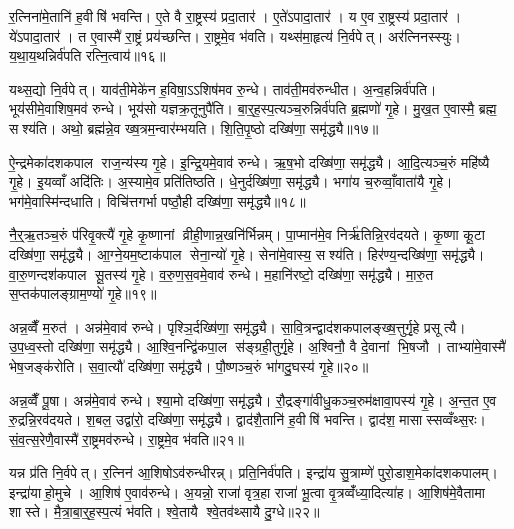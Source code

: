 र॒त्निना॑मे॒तानि॑ ह॒वीषि॑ भवन्ति। ए॒ते वै रा॒ष्ट्रस्य॑ प्रदा॒तार॑। ए॒ते॑ऽपादा॒तार॑। य ए॒व रा॒ष्ट्रस्य॑ प्रदा॒तार॑। ये॑ऽपादा॒तार॑। त ए॒वास्मै॑ रा॒ष्ट्रं प्रय॑च्छन्ति। रा॒ष्ट्रमे॒व भ॑वति। यथ्स॑मा॒हृत्य॑ नि॒र्वपेत्। अर॑त्निनस्स्युः। य॒था॒य॒थन्निर्व॑पति रत्नि॒त्वाय॑॥१६॥

यथ्स॒द्यो नि॒र्वपेत्। याव॑ती॒मेके॑न ह॒विषा॒ऽऽशिष॑मव रु॒न्धे। ताव॑ती॒मव॑रुन्धीत। अ॒न्व॒हन्निर्व॑पति। भूय॑सीमे॒वाशिष॒मव॑ रुन्धे। भूय॑सो यज्ञक्र॒तूनुपै॑ति। बा॒र्॒ह॒स्प॒त्यञ्च॒रुन्निर्व॑पति ब्र॒ह्मणो॑ गृ॒हे। मु॒ख॒त ए॒वास्मै॒ ब्रह्म॒ सश्य॑ति। अथो॒ ब्रह्म॑न्ने॒व ख्ष॒त्रम॒न्वार॑म्भयति। शि॒ति॒पृ॒ष्ठो दख्षि॑णा॒ समृ॑द्ध्यै॥१७॥

ऐ॒न्द्रमेका॑दशकपाल राज॒न्य॑स्य गृ॒हे। इ॒न्द्रि॒यमे॒वाव॑ रुन्धे। ऋ॒ष॒भो दख्षि॑णा॒ समृ॑द्ध्यै। आ॒दि॒त्यञ्च॒रुं महि॑ष्यै गृ॒हे। इ॒यव्वाँ अदि॑तिः। अ॒स्यामे॒व प्रति॑तिष्ठति। धे॒नुर्दख्षि॑णा॒ समृ॑द्ध्यै। भगा॑य च॒रुव्वाँ॒वाता॑यै गृ॒हे। भग॑मे॒वास्मि॑न्दधाति। विचि॑त्तगर्भा पष्ठौ॒ही दख्षि॑णा॒ समृ॑द्ध्यै॥१८॥

नै॒र्॒ऋ॒तञ्च॒रुं प॑रिवृ॒क्त्यै॑ गृ॒हे कृ॒ष्णानां व्रीही॒णान्न॒खनि॑र्भिन्नम्। पा॒प्मान॑मे॒व निर्\mbox{}ऋ॑तिन्नि॒रव॑दयते। कृ॒ष्णा कू॒टा दख्षि॑णा॒ समृ॑द्ध्यै। आ॒ग्ने॒यम॒ष्टाक॑पाल सेना॒न्यो॑ गृ॒हे। सेना॑मे॒वास्य॒ सश्य॑ति। हिर॑ण्य॒न्दख्षि॑णा॒ समृ॑द्ध्यै। वा॒रु॒णन्दश॑कपाल सू॒तस्य॑ गृ॒हे। व॒रु॒ण॒स॒वमे॒वाव॑ रुन्धे। म॒हानि॑रष्टो॒ दख्षि॑णा॒ समृ॑द्ध्यै। मा॒रु॒त स॒प्तक॑पालङ्ग्राम॒ण्यो॑ गृ॒हे॥१९॥

अन्न॒व्वैँ म॒रुत॑। अन्न॑मे॒वाव॑ रुन्धे। पृश्ञि॒र्दख्षि॑णा॒ समृ॑द्ध्यै। सा॒वि॒त्रन्द्वाद॑शकपालङ्ख्ष॒त्तुर्गृ॒हे प्रसूत्यै। उ॒प॒ध्व॒स्तो दख्षि॑णा॒ समृ॑द्ध्यै। आ॒श्वि॒नन्द्वि॑कपा॒ल स॑ङ्ग्रही॒तुर्गृ॒हे। अ॒श्विनौ॒ वै दे॒वानां भि॒षजौ। ताभ्या॑मे॒वास्मै॑ भेष॒जङ्क॑रोति। स॒वा॒त्यौ॑ दख्षि॑णा॒ समृ॑द्ध्यै। पौ॒ष्णञ्च॒रुं भा॑गदु॒घस्य॑ गृ॒हे॥२०॥

अन्न॒व्वैँ पू॒षा। अन्न॑मे॒वाव॑ रुन्धे। श्या॒मो दख्षि॑णा॒ समृ॑द्ध्यै। रौ॒द्रङ्गा॑वीधु॒कञ्च॒रुम॑क्षावा॒पस्य॑ गृ॒हे। अ॒न्त॒त ए॒व रु॒द्रन्नि॒रव॑दयते। श॒बल॒ उद्वा॑रो॒ दख्षि॑णा॒ समृ॑द्ध्यै। द्वाद॑शै॒तानि॑ ह॒वीषि॑ भवन्ति। द्वाद॑श॒ मासास्सव्वँथ्स॒रः। सं॒व॒त्स॒रेणै॒वास्मै॑ रा॒ष्ट्रमव॑रुन्धे। रा॒ष्ट्रमे॒व भ॑वति॥२१॥

यन्न प्र॑ति नि॒र्वपेत्। र॒त्निन॑ आ॒शिषोऽव॑रुन्धीरन्न्। प्रति॒निर्व॑पति। इन्द्रा॑य सु॒त्राम्णे॑ पुरो॒डाश॒मेका॑दशकपालम्। इन्द्रा॑याहो॒मुचे। आ॒शिष॑ ए॒वाव॑रुन्धे। अ॒यन्नो॒ राजा॑ वृत्र॒हा राजा॑ भू॒त्वा वृ॒त्रव्वँ॑ध्या॒दित्या॑ह। आ॒शिष॑मे॒वैतामा शास्ते। मै॒त्रा॒बा॒र्॒ह॒स्प॒त्यं भ॑वति। श्वे॒तायै श्वे॒तव॑थ्सायै दु॒ग्धे॥२२॥

